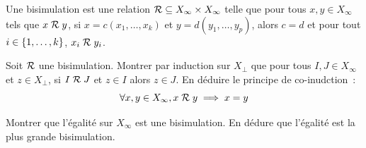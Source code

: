 \begin{problem}[La coinduction]
  Une bisimulation est une relation
  $\mathord{\mathrel{\mathcal{R}}}\subseteq X_\infty\times X_\infty$ telle que pour tous
  $x,y\in X_\infty$ tels que $x\mathrel{\mathcal{R}} y$, si $x = c(x_1,\ldots,x_k)$ et
  $y = d(y_1,\ldots,y_p)$, alors $c = d$ et pour tout $i\in\{1,\ldots,k\}$,
  $x_i\mathrel{\mathcal{R}} y_i$.

  \begin{pbQuest}
  \item Soit $\mathrel{\mathcal{R}}$ une bisimulation. Montrer par induction sur $X_\bot$ que
    pour tous $I,J\in X_\infty$ et $z \in X_\bot$, si $I\mathrel{\mathcal{R}} J$ et $z\in I$
    alors $z \in J$. En déduire le principe de co-inudction~:
    \[\forall x,y\in X_\infty, x \mathrel{\mathcal{R}} y \implies x = y \]
  \item Montrer que l'égalité sur $X_\infty$ est une bisimulation. En dédure que
    l'égalité est la plus grande bisimulation.
  \end{pbQuest}
\end{problem}


\clearpage


